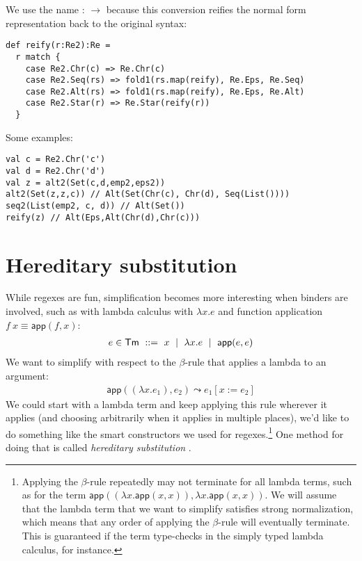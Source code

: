We use the name  :  $\to$  because this conversion reifies the normal form representation back to the original syntax:

\begin{lstlisting}
def reify(r:Re2):Re =
  r match {
    case Re2.Chr(c) => Re.Chr(c)
    case Re2.Seq(rs) => fold1(rs.map(reify), Re.Eps, Re.Seq)
    case Re2.Alt(rs) => fold1(rs.map(reify), Re.Eps, Re.Alt)
    case Re2.Star(r) => Re.Star(reify(r))
  }
\end{lstlisting}

Some examples:
\begin{lstlisting}
val c = Re2.Chr('c')
val d = Re2.Chr('d')
val z = alt2(Set(c,d,emp2,eps2))
alt2(Set(z,z,c)) // Alt(Set(Chr(c), Chr(d), Seq(List())))
seq2(List(emp2, c, d)) // Alt(Set())
reify(z) // Alt(Eps,Alt(Chr(d),Chr(c)))
\end{lstlisting}


\section{Hereditary substitution}

\newcommand{\ap}{\mathsf{app}}
\newcommand{\steps}{\leadsto}

While regexes are fun, simplification becomes more interesting when binders are involved, such as with lambda calculus with $\lambda x. e$ and function application $f\ x \equiv \ap(f,x)$:
\begin{align*}
  e \in \mathsf{Tm} \ ::=\  x \md \lambda x. e \md \ap(e,e)
\end{align*}
We want to simplify with respect to the $\beta$-rule that applies a lambda to an argument:
\begin{align*}
  \ap((\lambda x. e_1), e_2) \steps e_1[x := e_2]
\end{align*}
We could start with a lambda term and keep applying this rule wherever it applies (and choosing arbitrarily when it applies in multiple places), we'd like to do something like the smart constructors we used for regexes.\footnote{Applying the $\beta$-rule repeatedly may not terminate for all lambda terms, such as for the term $\ap((\lambda x. \ap(x,x)), \lambda x. \ap(x,x))$. We will assume that the lambda term that we want to simplify satisfies strong normalization, which means that any order of applying the $\beta$-rule will eventually terminate. This is guaranteed if the term type-checks in the simply typed lambda calculus, for instance.}
One method for doing that is called \emph{hereditary substitution} \cite{keller:inria-00520606}.

